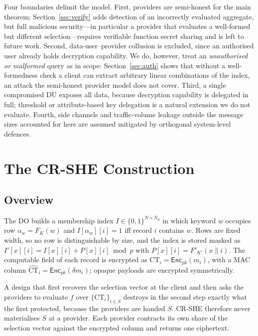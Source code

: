 \documentclass[journal]{IEEEtran}
\newcommand{\Enc}{\mathsf{Enc}}
\begin{document}
Four boundaries delimit the model. First, providers are semi-honest for the main theorem; Section~\ref{sec:verify} adds detection of an incorrectly evaluated aggregate, but full malicious security---in particular a provider that evaluates a well-formed but different selection---requires verifiable function secret sharing and is left to future work. Second, data-user--provider collusion is excluded, since an authorised user already holds decryption capability. We do, however, treat an \emph{unauthorised or malformed} query as in scope: Section~\ref{sec:auth} shows that without a well-formedness check a client can extract arbitrary linear combinations of the index, an attack the semi-honest provider model does not cover. Third, a single compromised DU exposes all data, because decryption capability is delegated in full; threshold or attribute-based key delegation is a natural extension we do not evaluate. Fourth, side channels and traffic-volume leakage outside the message sizes accounted for here are assumed mitigated by orthogonal system-level defences.

\section{The CR-SHE Construction}
\label{sec:construction}

\subsection{Overview}
The DO builds a membership index $I\in\{0,1\}^{N\times N_d}$ in which keyword $w$ occupies row $\alpha_w=F_K(w)$ and $I[\alpha_w][i]=1$ iff record $i$ contains $w$. Rows are fixed width, so no row is distinguishable by size, and the index is stored masked as $I'[x][i]=I[x][i]+P[x][i]\bmod p$ with $P[x][i]=F'_{K'}(x\|i)$. The computable field of each record is encrypted as $\text{CT}_i=\Enc_{pk}(m_i)$, with a MAC column $\widehat{\text{CT}}_i=\Enc_{pk}(\delta m_i)$; opaque payloads are encrypted symmetrically.

A design that first recovers the selection vector at the client and then asks the providers to evaluate $f$ over $\{\text{CT}_i\}_{i\in S}$ destroys in the second step exactly what the first protected, because the providers are handed $S$. CR-SHE therefore never materialises $S$ at a provider. Each provider contracts its own share of the selection vector against the encrypted column and returns one ciphertext.
\end{document}

